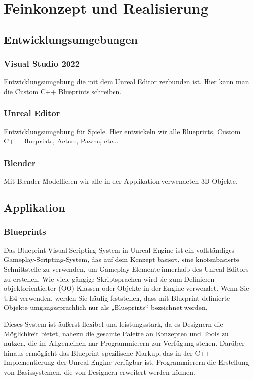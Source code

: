 \chapter{Feinkonzept und Realisierung}

\section{Entwicklungsumgebungen}
\subsection{Visual Studio 2022}
Entwicklungsumgebung die mit dem Unreal Editor verbunden ist. Hier kann man die Custom C++
Blueprints schreiben.

\subsection{Unreal Editor}
Entwicklungsumgebung für Spiele. Hier entwickeln wir alle Blueprints, Custom C++ Blueprints,
Actors, Pawns, etc...

\subsection{Blender}
Mit Blender Modellieren wir alle in der Applikation verwendeten 3D-Objekte.

\section{Applikation}

\subsection{Blueprints}
Das Blueprint Visual Scripting-System in Unreal Engine ist ein vollständiges
Gameplay-Scripting-System, das auf dem Konzept basiert, eine knotenbasierte Schnittstelle
zu verwenden, um Gameplay-Elemente innerhalb des Unreal Editors zu erstellen.
Wie viele gängige Skriptsprachen wird sie zum Definieren objektorientierter (OO) Klassen
oder Objekte in der Engine verwendet. Wenn Sie UE4 verwenden, werden Sie häufig feststellen,
dass mit Blueprint definierte Objekte umgangssprachlich nur als „Blueprints“ bezeichnet werden.

Dieses System ist äußerst flexibel und leistungsstark, da es Designern die Möglichkeit bietet,
nahezu die gesamte Palette an Konzepten und Tools zu nutzen, die im Allgemeinen nur
Programmierern zur Verfügung stehen. Darüber hinaus ermöglicht das Blueprint-spezifische
Markup, das in der C++-Implementierung der Unreal Engine verfügbar ist, Programmierern die
Erstellung von Basissystemen, die von Designern erweitert werden können.

